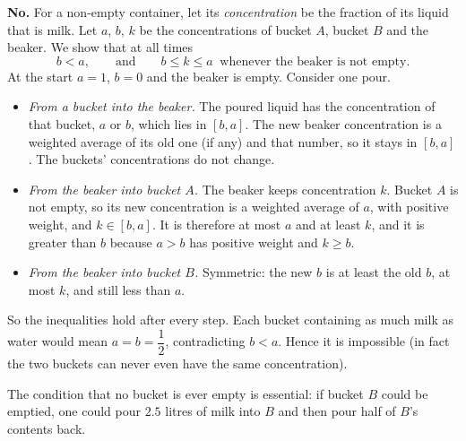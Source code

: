 \textbf{No.} For a non-empty container, let its \emph{concentration} be the fraction of its liquid that is milk. Let $a$, $b$, $k$ be the concentrations of bucket $A$, bucket $B$ and the beaker. We show that at all times
\[
b<a,\qquad\text{and}\qquad b\le k\le a\ \text{ whenever the beaker is not empty}.
\]
At the start $a=1$, $b=0$ and the beaker is empty. Consider one pour.
\begin{itemize}
\item \emph{From a bucket into the beaker.} The poured liquid has the concentration of that bucket, $a$ or $b$, which lies in $[b,a]$. The new beaker concentration is a weighted average of its old one (if any) and that number, so it stays in $[b,a]$. The buckets' concentrations do not change.
\item \emph{From the beaker into bucket $A$.} The beaker keeps concentration $k$. Bucket $A$ is not empty, so its new concentration is a weighted average of $a$, with positive weight, and $k\in[b,a]$. It is therefore at most $a$ and at least $k$, and it is greater than $b$ because $a>b$ has positive weight and $k\ge b$.
\item \emph{From the beaker into bucket $B$.} Symmetric: the new $b$ is at least the old $b$, at most $k$, and still less than $a$.
\end{itemize}
So the inequalities hold after every step. Each bucket containing as much milk as water would mean $a=b=\dfrac{1}{2}$, contradicting $b<a$. Hence it is impossible (in fact the two buckets can never even have the same concentration).

The condition that no bucket is ever empty is essential: if bucket $B$ could be emptied, one could pour $2.5$ litres of milk into $B$ and then pour half of $B$'s contents back.
